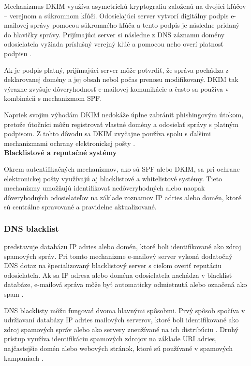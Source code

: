 \documentclass[conference]{IEEEtran}
\begin{document}
Mechanizmus DKIM využíva asymetrickú kryptografiu
založenú na dvojici kľúčov – verejnom a súkromnom kľúči.
Odosielajúci server vytvorí digitálny podpis e-mailovej
správy pomocou súkromného kľúča a tento podpis je následne
pridaný do hlavičky správy. Prijímajúci server si následne
z DNS záznamu domény odosielateľa vyžiada príslušný
verejný kľúč a pomocou neho overí platnosť podpisu
\cite{rfc6376}.

Ak je podpis platný, prijímajúci server môže potvrdiť, že
správa pochádza z deklarovanej domény a jej obsah nebol
počas prenosu modifikovaný. DKIM tak výrazne zvyšuje
dôveryhodnosť e-mailovej komunikácie a často sa používa
v kombinácii s mechanizmom SPF.

Napriek svojim výhodám DKIM nedokáže úplne zabrániť
phishingovým útokom, pretože útočníci môžu registrovať
vlastné domény a odosielať správy s platným podpisom.
Z tohto dôvodu sa DKIM zvyčajne používa spolu s ďalšími
mechanizmami ochrany elektronickej pošty
\cite{karim2019spam}.\\


\textbf{Blacklistové a reputačné systémy}

Okrem autentifikačných mechanizmov, ako sú SPF alebo DKIM,
sa pri ochrane elektronickej pošty využívajú aj blacklistové
a whitelistové systémy. Tieto mechanizmy umožňujú identifikovať
nedôveryhodných alebo naopak dôveryhodných odosielateľov
na základe zoznamov IP adries alebo domén, ktoré sú
centrálne spravované a pravidelne aktualizované.

\subsubsection*{DNS blacklist}

predstavuje databázu IP adries alebo
domén, ktoré boli identifikované ako zdroj spamových správ.
Pri tomto mechanizme e-mailový server vykoná dodatočný
DNS dotaz na špecializovaný blacklistový server s cieľom
overiť reputáciu odosielateľa. Ak sa IP adresa alebo doména
odosielateľa nachádza v blacklist databáze, e-mailová správa
môže byť automaticky odmietnutá alebo označená ako spam
\cite{karim2019spam}.

DNS blacklisty môžu fungovať dvoma hlavnými spôsobmi.
Prvý spôsob spočíva v udržiavaní databázy IP adries
mailových serverov, ktoré boli identifikované ako zdroj
spamových správ alebo ako servery zneužívané na ich
distribúciu \cite{karim2019spam}. Druhý prístup využíva
identifikáciu spamových zdrojov na základe URI adries,
najčastejšie domén alebo webových stránok, ktoré sú
používané v spamových kampaniach \cite{karim2019spam}.
\end{document}
